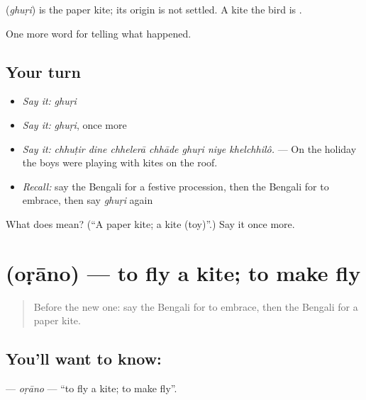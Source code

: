\begin{cousinweb}
\textbf{} (\emph{ghuṛi}) is the paper kite; its origin is not settled. A kite the bird is \textbf{}.
\end{cousinweb}

\begin{grammarlens}[title={What you've built}]
One more word for telling what happened.
\end{grammarlens}

\subsection*{Your turn}
\begin{itemize}
\raggedright
  \item \emph{Say it:} \emph{ghuṛi}
  \item \emph{Say it:} \emph{ghuṛi}, once more
  \item \emph{Say it:} \emph{chhuṭir dine chhelerā chhāde ghuṛi niye khelchhilô.} — On the holiday the boys were playing with kites on the roof.
  \item \emph{Recall:} say the Bengali for a festive procession, then the Bengali for to embrace, then say \emph{ghuṛi} again
\end{itemize}

\begin{tcolorbox}[breakable,colback=teal!4,colframe=teal!35!black,title={Before you move on}]
What does  mean? (\textquotedblleft{}A paper kite; a kite (toy)\textquotedblright{}.) Say it once more.
\end{tcolorbox}
\section[\texorpdfstring{\bn{ওড়ানো} (oṛāno)}{ওড়ানো (oṛāno)}]{ (oṛāno) — to fly a kite; to make fly}

\label{lesson:BN-C309-orano}



\begin{quote}
Before the new one: say the Bengali for to embrace, then the Bengali for a paper kite.
\end{quote}

\subsection*{You'll want to know: }
\textbf{} — \emph{oṛāno} — \textquotedblleft{}to fly a kite; to make fly\textquotedblright{}.


